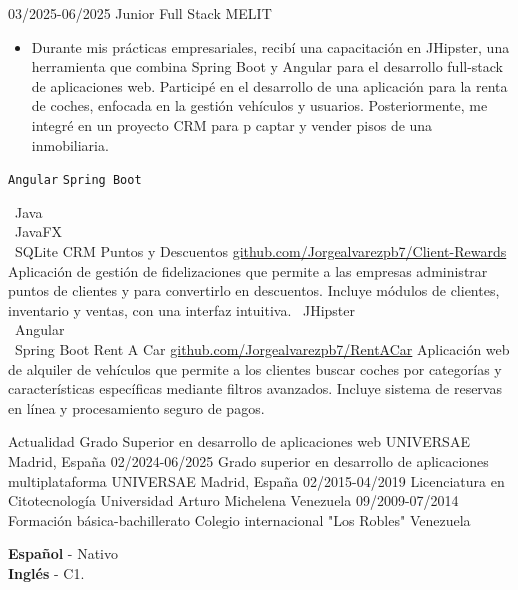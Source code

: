 \documentclass[9pt]{./src/developercv} %
\begin{document}
\vspace{10 pt}
\begin{entrylist}
	\entry
	{03/2025-06/2025}
	{Junior Full Stack}
	{MELIT}
	{\vspace{-10pt}
		\begin{itemize}[noitemsep,topsep=0pt,parsep=0pt,partopsep=0pt, leftmargin=-1pt]
			\item {Durante mis prácticas empresariales, recibí una capacitación en JHipster, una herramienta que combina Spring Boot y Angular para el desarrollo full-stack de aplicaciones web. Participé en el desarrollo de una aplicación para la renta de coches, enfocada en la gestión vehículos y usuarios. Posteriormente, me integré en un proyecto CRM para p captar y vender pisos de una inmobiliaria.}
		\end{itemize}
		\texttt{Angular} \slashsep \texttt{Spring Boot}}
\end{entrylist}

\begin{entrylist}
	\entry
	{ \textbullet\ Java \\ \textbullet\ JavaFX \\ \textbullet\ SQLite}
	{CRM Puntos y Descuentos}
	{\href {https://github.com/Jorgealvarezpb7/Client-Rewards}          {github.com/Jorgealvarezpb7/Client-Rewards}}
	{Aplicación de gestión de fidelizaciones que permite a las empresas administrar puntos de clientes y para convertirlo en descuentos. Incluye módulos de clientes, inventario y ventas, con una interfaz intuitiva.}
	\entry
	{ \textbullet\ JHipster \\ \textbullet\ Angular \\ \textbullet\ Spring Boot}
	{Rent A Car}
	{\href {https://github.com/Jorgealvarezpb7/RentACar}          {github.com/Jorgealvarezpb7/RentACar}}
	{Aplicación web de alquiler de vehículos que permite a los clientes buscar coches por categorías y características específicas mediante filtros avanzados. Incluye sistema de reservas en línea y procesamiento seguro de pagos.}
\end{entrylist}

\vspace{-10 pt}
\begin{entrylist}
	\entry
	{Actualidad}
	{Grado Superior en desarrollo de aplicaciones web}
	{UNIVERSAE}
	{Madrid, España}
	\entry
	{02/2024-06/2025}
	{Grado superior en desarrollo de aplicaciones multiplataforma}
	{UNIVERSAE}
	{Madrid, España}
	\entry
	{02/2015-04/2019}
	{Licenciatura en Citotecnología}
	{Universidad Arturo Michelena}
	{Venezuela}
	\entry
	{09/2009-07/2014}
	{Formación básica-bachillerato}
	{Colegio internacional "Los Robles"}
	{Venezuela}
\end{entrylist}

\vspace{-10 pt}
\vspace{-6pt}

\textbf{Español} - Nativo \\
\textbf{Inglés} - C1.
\end{document}
